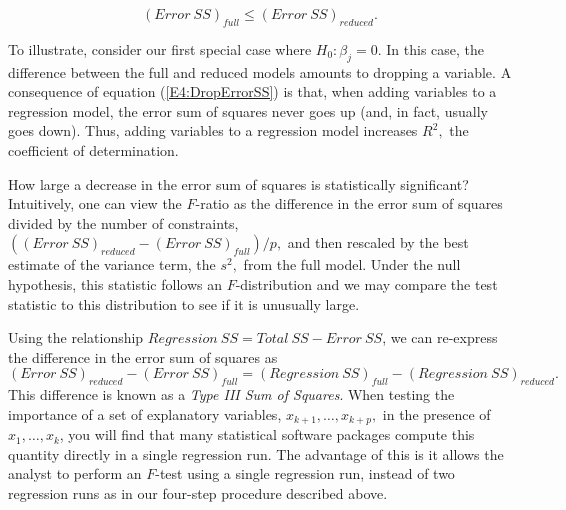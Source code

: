 \begin{equation}\label{E4:DropErrorSS}
(Error~SS)_{full}\leq (Error~SS)_{reduced}.
\end{equation}



To illustrate, consider our first special case where $H_0 : \beta_j
= 0$. In this case, the difference between the full and reduced
models amounts to dropping a variable. A consequence of equation
(\ref{E4:DropErrorSS}) is that, when adding variables to a
regression model, the error sum of squares never goes up (and, in
fact, usually goes down). Thus, adding variables to a regression
model increases $R^2,$ the coefficient of determination.

How large a decrease in the error sum of squares is statistically
significant? Intuitively, one can view the $F$-ratio as the
difference in the error sum of squares divided by the number of
constraints, $((Error~SS)_{reduced}-(Error~SS)_{full})/p,$ and then
rescaled by the best estimate of the variance term, the $s^2,$ from
the full model. Under the null hypothesis, this statistic follows an
$F$-distribution and we may compare the test statistic to this
distribution to see if it is unusually large.

Using the relationship $Regression~SS=Total~SS-Error~SS$, we can
re-express the difference in the error sum of squares as
\begin{equation*}
(Error~SS)_{reduced}-(Error~SS)_{full}=(Regression~SS)_{full}-(Regression~SS)_{reduced}.
\end{equation*} 
This difference is known as a \emph{Type III Sum of Squares}. When
testing the importance of a set of explanatory variables,
$x_{k+1},\ldots,x_{k+p},$ in the presence of $x_1,\ldots,x_k$, you
will find that many statistical software packages compute this
quantity directly in a single regression run. The advantage of this
is it allows the analyst to perform an $F$-test using a single
regression run, instead of two regression runs as in our four-step
procedure described above.

\linejed

